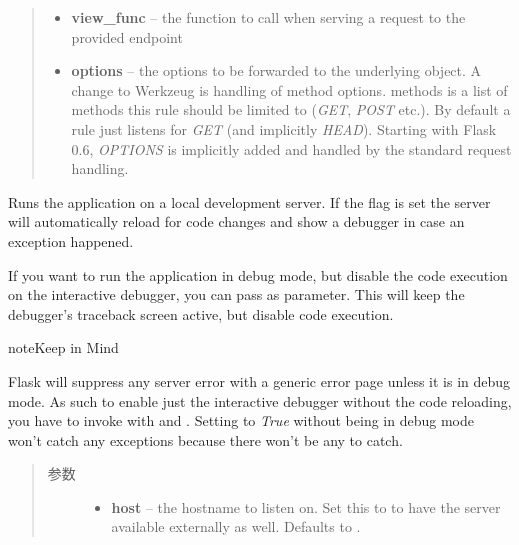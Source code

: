 \documentclass[a4paper,12pt]{sphinxmanual}
\begin{document}
\begin{fulllineitems}
\begin{fulllineitems}
\begin{quote}
\begin{description}
\begin{itemize}
\item {} 
\textbf{view\_func} -- the function to call when serving a request to the
provided endpoint

\item {} 
\textbf{options} -- the options to be forwarded to the underlying
\href{http://werkzeug.pocoo.org/docs/routing/\#werkzeug.routing.Rule}{} object.  A change
to Werkzeug is handling of method options.  methods
is a list of methods this rule should be limited
to (\emph{GET}, \emph{POST} etc.).  By default a rule
just listens for \emph{GET} (and implicitly \emph{HEAD}).
Starting with Flask 0.6, \emph{OPTIONS} is implicitly
added and handled by the standard request handling.

\end{itemize}

\end{description}\end{quote}

\end{fulllineitems}


\begin{fulllineitems}
\label{api:flask.Flask.run}
Runs the application on a local development server.  If the
{\hyperref[api:flask.Flask.debug]{}} flag is set the server will automatically reload
for code changes and show a debugger in case an exception happened.

If you want to run the application in debug mode, but disable the
code execution on the interactive debugger, you can pass
 as parameter.  This will keep the debugger's
traceback screen active, but disable code execution.

\begin{notice}{note}{Keep in Mind}

Flask will suppress any server error with a generic error page
unless it is in debug mode.  As such to enable just the
interactive debugger without the code reloading, you have to
invoke {\hyperref[api:flask.Flask.run]{}} with  and .
Setting  to \emph{True} without being in debug mode
won't catch any exceptions because there won't be any to
catch.
\end{notice}
\begin{quote}\begin{description}
\item[{参数}] \leavevmode\begin{itemize}
\item {} 
\textbf{host} -- the hostname to listen on. Set this to  to
have the server available externally as well. Defaults to
.


\end{itemize}
\end{description}
\end{quote}
\end{fulllineitems}
\end{fulllineitems}
\end{document}
